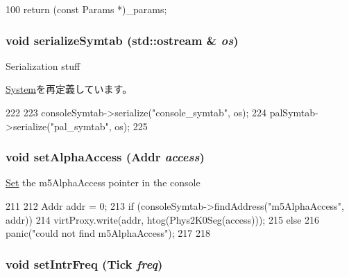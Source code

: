 \begin{DoxyCode}
100 { return (const Params *)_params; }
\end{DoxyCode}
\hypertarget{classAlphaSystem_a4a3f2000b7188750d8fc90aa204fbfd9}{
\subsubsection[{serializeSymtab}]{\setlength{\rightskip}{0pt plus 5cm}void serializeSymtab (std::ostream \& {\em os})}}
\label{classAlphaSystem_a4a3f2000b7188750d8fc90aa204fbfd9}
Serialization stuff 

\hyperlink{classSystem_a4a6e514fbf1ef35f9a914680884cedef}{System}を再定義しています。


\begin{DoxyCode}
222 {
223     consoleSymtab->serialize("console_symtab", os);
224     palSymtab->serialize("pal_symtab", os);
225 }
\end{DoxyCode}
\hypertarget{classAlphaSystem_a67fd461df8578f316a9be1cc3e5d70ec}{
\subsubsection[{setAlphaAccess}]{\setlength{\rightskip}{0pt plus 5cm}void setAlphaAccess ({\bf Addr} {\em access})}}
\label{classAlphaSystem_a67fd461df8578f316a9be1cc3e5d70ec}
\hyperlink{classSet}{Set} the m5AlphaAccess pointer in the console 


\begin{DoxyCode}
211 {
212     Addr addr = 0;
213     if (consoleSymtab->findAddress("m5AlphaAccess", addr)) {
214         virtProxy.write(addr, htog(Phys2K0Seg(access)));
215     } else {
216         panic("could not find m5AlphaAccess\n");
217     }
218 }
\end{DoxyCode}
\hypertarget{classAlphaSystem_a5b06e992598acbcaa976da1a60396d27}{
\subsubsection[{setIntrFreq}]{\setlength{\rightskip}{0pt plus 5cm}void setIntrFreq ({\bf Tick} {\em freq})}}
\label{classAlphaSystem_a5b06e992598acbcaa976da1a60396d27}



